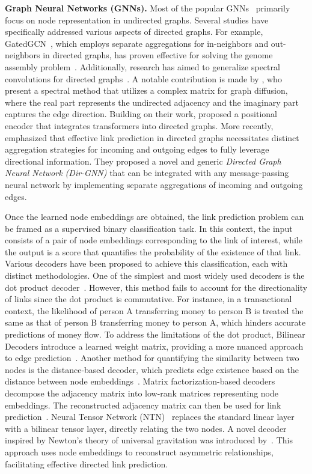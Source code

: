 \textbf{Graph Neural Networks (GNNs).} Most of the popular GNNs~\citep{kipf2016semi, hamilton2017inductive, velivckovic2017graph, ying2018graph} primarily focus on node representation in undirected graphs. Several studies have specifically addressed various aspects of directed graphs. For example, GatedGCN~\citep{li2015gated}, which employs separate aggregations for in-neighbors and out-neighbors in directed graphs, has proven effective for solving the genome assembly problem~\citep{vrvcek2022learning}. Additionally, research has aimed to generalize spectral convolutions for directed graphs~\cite{ma2019spectral, monti2018motifnet, tong2020directed, tong2020digraph}. A notable contribution is made by \citet{zhang2021magnet}, who present a spectral method that utilizes a complex matrix for graph diffusion, where the real part represents the undirected adjacency and the imaginary part captures the edge direction. Building on their work, \citet{geisler2023transformers} proposed a positional encoder that integrates transformers into directed graphs. More recently, \citet{rossi2024edge} emphasized that effective link prediction in directed graphs necessitates distinct aggregation strategies for incoming and outgoing edges to fully leverage directional information. They proposed a novel and generic \emph{Directed Graph Neural Network (Dir-GNN)} that can be integrated with any message-passing neural network by implementing separate aggregations of incoming and outgoing edges. 

Once the learned node embeddings are obtained, the link prediction problem can be framed as a supervised binary classification task. In this context, the input consists of a pair of node embeddings corresponding to the link of interest, while the output is a score that quantifies the probability of the existence of that link. Various decoders have been proposed to achieve this classification, each with distinct methodologies. One of the simplest and most widely used decoders is the dot product decoder~\citep{kipf2016semi}. However, this method fails to account for the directionality of links since the dot product is commutative. For instance, in a transactional context, the likelihood of person A transferring money to person B is treated the same as that of person B transferring money to person A, which hinders accurate predictions of money flow. To address the limitations of the dot product, Bilinear Decoders introduce a learned weight matrix, providing a more nuanced approach to edge prediction~\citep{yang2014embedding}. Another method for quantifying the similarity between two nodes is the distance-based decoder, which predicts edge existence based on the distance between node embeddings~\citep{ou2016asymmetric}. Matrix factorization-based decoders decompose the adjacency matrix into low-rank matrices representing node embeddings. The reconstructed adjacency matrix can then be used for link prediction~\citep{tang2015line}. Neural Tensor Network (NTN)~\citep{socher2013reasoning} replaces the standard linear layer with a bilinear tensor layer, directly relating the two nodes.  A novel decoder inspired by Newton's theory of universal gravitation was introduced by~\cite{salha2019gravity}. This approach uses node embeddings to reconstruct asymmetric relationships, facilitating effective directed link prediction.